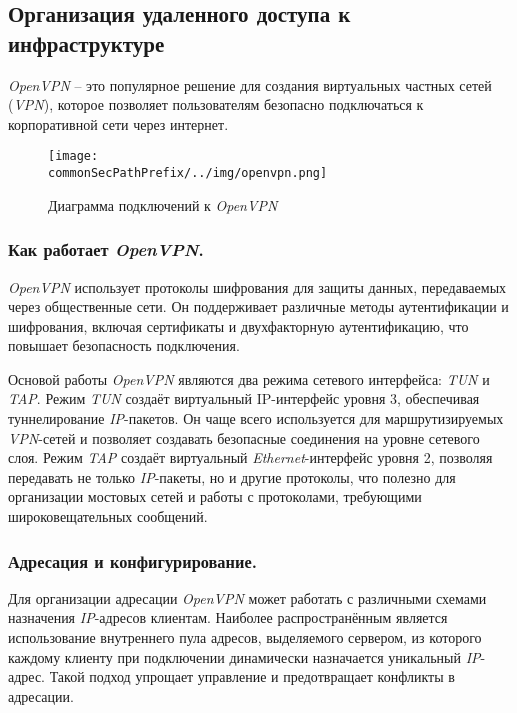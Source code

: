 \subsection{Организация удаленного доступа к инфраструктуре}
\label{sec:vpn}
\textit{OpenVPN} -- это популярное решение для создания виртуальных частных сетей (\textit{VPN})\cite{openvpn}, которое позволяет пользователям безопасно подключаться к корпоративной сети через интернет.

\begin{figure}[ht]
    \centering
    \texttt{[image: \\commonSecPathPrefix/../img/openvpn.png]}
    \caption{Диаграмма подключений к \textit{OpenVPN}}
    \label{fig:user_guide:openvpn_diagram}
\end{figure}

\subsubsection{Как работает \textit{OpenVPN}.}
\textit{OpenVPN} использует протоколы шифрования для защиты данных, передаваемых через общественные сети. Он поддерживает различные методы аутентификации и шифрования, включая сертификаты и двухфакторную аутентификацию, что повышает безопасность подключения.

Основой работы \textit{OpenVPN} являются два режима сетевого интерфейса: \textit{TUN} и \textit{TAP}. Режим \textit{TUN} создаёт виртуальный IP-интерфейс уровня 3, обеспечивая туннелирование \textit{IP}-пакетов. Он чаще всего используется для маршрутизируемых \textit{VPN}-сетей и позволяет создавать безопасные соединения на уровне сетевого слоя. Режим \textit{TAP} создаёт виртуальный \textit{Ethernet}-интерфейс уровня 2, позволяя передавать не только \textit{IP}-пакеты, но и другие протоколы, что полезно для организации мостовых сетей и работы с протоколами, требующими широковещательных сообщений.

\subsubsection{Адресация и конфигурирование.}
Для организации адресации \textit{OpenVPN} может работать с различными схемами назначения \textit{IP}-адресов клиентам. Наиболее распространённым является использование внутреннего пула адресов, выделяемого сервером, из которого каждому клиенту при подключении динамически назначается уникальный \textit{IP}-адрес. Такой подход упрощает управление и предотвращает конфликты в адресации.

